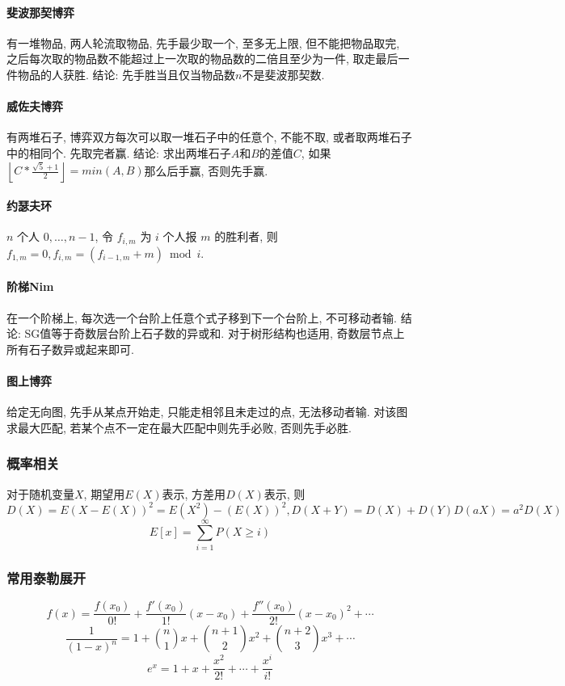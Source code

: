 \begin{small}
\begin{multicols}{2}
\paragraph{斐波那契博弈}有一堆物品, 两人轮流取物品, 先手最少取一个, 至多无上限, 但不能把物品取完, 之后每次取的物品数不能超过上一次取的物品数的二倍且至少为一件, 取走最后一件物品的人获胜. 结论: 先手胜当且仅当物品数$n$不是斐波那契数. 
\paragraph{威佐夫博弈}有两堆石子, 博弈双方每次可以取一堆石子中的任意个, 不能不取, 或者取两堆石子中的相同个. 先取完者赢. 结论: 求出两堆石子$A$和$B$的差值$C$, 如果$\left\lfloor C*\frac{\sqrt{5}+1}{2}\right\rfloor=min(A,B)$那么后手赢, 否则先手赢. 
\paragraph{约瑟夫环}$n$ 个人 $0,\dots,n-1$, 令 $f_{i,m}$ 为 $i$ 个人报 $m$ 的胜利者, 则 $f_{1,m}=0,f_{i,m}=(f_{i-1,m}+m)\bmod i$. 
\paragraph{阶梯Nim} 在一个阶梯上, 每次选一个台阶上任意个式子移到下一个台阶上, 不可移动者输. 结论: SG值等于奇数层台阶上石子数的异或和. 对于树形结构也适用, 奇数层节点上所有石子数异或起来即可.
\paragraph{图上博弈} 给定无向图, 先手从某点开始走, 只能走相邻且未走过的点, 无法移动者输. 对该图求最大匹配, 若某个点不一定在最大匹配中则先手必败, 否则先手必胜.
\end{multicols}


\subsubsection{概率相关}
对于随机变量$X$, 期望用$E(X)$表示, 方差用$D(X)$表示, 则$D(X)=E(X-E(X))^2=E(X^2)-(E(X))^2,D(X+Y)=D(X)+D(Y)D(aX)=a^2D(X)$
\[E[x]=\sum_{i=1}^{\infty}P(X\geq i)\]
\subsubsection{常用泰勒展开}
\[f(x)=\frac{f(x_0)}{0!}+\frac{f'(x_0)}{1!}(x-x_0)+\frac{f''(x_0)}{2!}(x-x_0)^2+\cdots\]
\[\frac{1}{(1-x)^n}=1+\binom{n}{1}x+\binom{n+1}{2}x^2+\binom{n+2}{3}x^3+\cdots \]
\[e^x=1+x+\frac{x^2}{2!}+\cdots+\frac{x^i}{i!}\]


\end{small}
